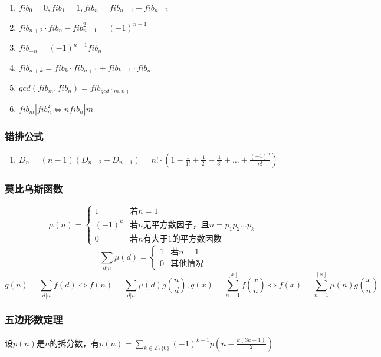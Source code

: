 \documentclass[landscape,a4paper]{article}
\begin{document}
\begin{spacing}{0.3}
\begin{multicols}{2}
\begin{enumerate}
	\item $fib_0=0, fib_1=1, fib_n=fib_{n-1}+fib_{n-2}$
	\item $fib_{n+2} \cdot fib_n-fib_{n+1}^2=(-1)^{n+1}$
	\item $fib_{-n}=(-1)^{n-1}fib_n$
	\item $fib_{n+k}=fib_k \cdot fib_{n+1}+fib_{k-1} \cdot fib_n$
	\item $gcd(fib_m, fib_n)=fib_{gcd(m, n)}$
	\item $fib_m|fib_n^2\Leftrightarrow nfib_n|m$
\end{enumerate}

\subsubsection{错排公式}

\begin{enumerate}
	\item $D_n = (n-1)(D_{n-2}-D_{n-1})
	= n! \cdot (1-\frac{1}{1!}+\frac{1}{2!}-\frac{1}{3!}+\ldots+\frac{(-1)^n}{n!})$
\end{enumerate}

\subsubsection{莫比乌斯函数}

$$\mu(n) = \begin{cases}
	1 & \text{若}n=1\\
	(-1)^k & \text{若}n\text{无平方数因子，且}n = p_1p_2\dots p_k\\
	0 & \text{若}n\text{有大于}1\text{的平方数因数}
\end{cases}$$
$$\sum_{d|n}{\mu(d)} = \begin{cases}
	1 & \text{若}n=1\\
	0 & \text{其他情况}
\end{cases}$$
$$g(n) = \sum_{d|n}{f(d)} \Leftrightarrow f(n) = \sum_{d|n}{\mu(d)g(\frac{n}{d})}
,       g(x) = \sum_{n=1}^{[x]}f(\frac{x}{n}) \Leftrightarrow f(x) = \sum_{n=1}^{[x]}{\mu(n)g(\frac{x}{n})}$$

\subsubsection{五边形数定理}

设$p(n)$是$n$的拆分数，有$p(n) = \sum_{k \in \mathbb{Z} \setminus \{0\}} (-1)^{k - 1} p\left(n - \frac{k(3k - 1)}{2}\right)$


\end{multicols}
\end{spacing}
\end{document}
